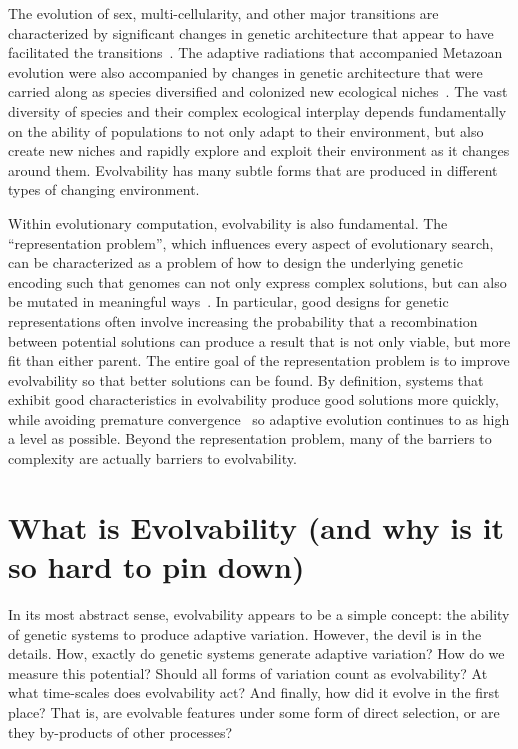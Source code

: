 \documentclass[PhD]{msu-thesis}
\begin{document}
The evolution of sex, multi-cellularity, and other major transitions are characterized by significant changes in genetic architecture that appear to have facilitated the transitions~\cite{smith_major_1995}. The adaptive radiations that accompanied Metazoan evolution were also accompanied by changes in genetic architecture that were carried along as species diversified and colonized new ecological niches~\cite{kirschner_evolvability_1998}. %
The vast diversity of species and their complex ecological interplay depends fundamentally on the ability of populations to not only adapt to their environment, but also create new niches and rapidly explore and exploit their environment as it changes around them. 
Evolvability has many subtle forms that are produced in different types of changing environment.

Within evolutionary computation, evolvability is also fundamental. The ``representation problem'', which influences every aspect of evolutionary search, can be characterized as a problem of how to design the underlying genetic encoding such that genomes can not only express complex solutions, but can also be mutated in meaningful ways~\cite{dawkins_13_2003}. In particular, good designs for genetic representations often involve increasing the probability that a recombination between potential solutions can produce a result that is not only viable, but more fit than either parent. The entire goal of the representation problem is to improve evolvability so that better solutions can be found. By definition, systems that exhibit good characteristics in evolvability produce good solutions more quickly, while avoiding premature convergence~\cite{altenberg_evolution_1994} so adaptive evolution continues to as high a level as possible. Beyond the representation problem, many of the barriers to complexity are actually barriers to evolvability.

\section{What is Evolvability (and why is it so hard to pin down)}
In its most abstract sense, evolvability appears to be a simple concept: the ability of genetic systems to produce adaptive variation. However, the devil is in the details. How, exactly do genetic systems generate adaptive variation? How do we measure this potential? Should all forms of variation count as evolvability? At what time-scales does evolvability act? And finally, how did it evolve in the first place? That is, are evolvable features under some form of direct selection, or are they by-products of other processes?
\end{document}
